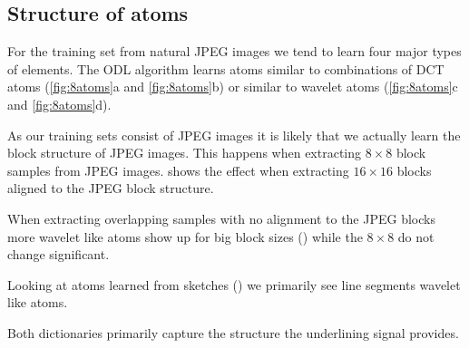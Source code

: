 \subsection{Structure of atoms}
For the training set from natural JPEG images we tend to learn four major types
of elements.
The ODL algorithm learns atoms similar to combinations of DCT atoms
(\ref{fig:8atoms}a and  \ref{fig:8atoms}b) or similar to wavelet atoms
(\ref{fig:8atoms}c and \ref{fig:8atoms}d).

As our training sets consist of JPEG images it is likely that we actually learn
the block structure of JPEG images. This happens when extracting
$8\times 8$ block samples from JPEG images.
 shows the effect when extracting $16\times 16$
blocks aligned to the JPEG block structure.

When extracting overlapping samples with no alignment to the JPEG
blocks more wavelet like atoms show up for big block sizes
()
while the $8\times 8$ do not change significant. 


Looking at atoms learned from sketches ()
we primarily see line segments wavelet like atoms.

Both dictionaries primarily capture the structure the underlining
signal provides. 

